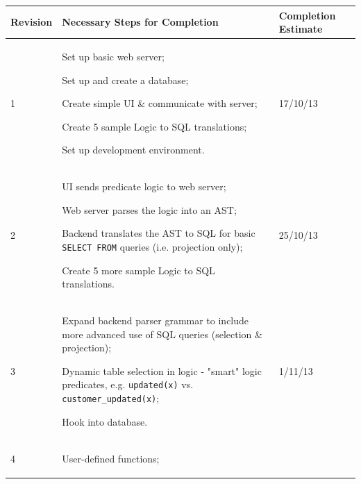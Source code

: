 \documentclass[a4paper, 11pt]{article}
\begin{document}
    \begin{table}[H]
      \centering
      \begin{tabular}{| l | p{} | l |}
        \hline
        \textbf{Revision} & \textbf{Necessary Steps for Completion}
          & \textbf{Completion Estimate} \\
        \hline
        1 &
          \begin{compactitem}
            \item Set up basic web server;
            \item Set up and create a database;
            \item Create simple UI \& communicate with server;
            \item Create 5 sample Logic to SQL translations;
            \item Set up development environment.
          \end{compactitem}
          & 17/10/13 \\
        \hline
        2 &
          \begin{compactitem}
            \item UI sends predicate logic to web server;
            \item Web server parses the logic into an AST;
            \item Backend translates the AST to SQL for basic \texttt{SELECT
              FROM} queries (i.e. projection only);
            \item Create 5 more sample Logic to SQL translations.
          \end{compactitem}
          & 25/10/13 \\
        \hline
        3 &
          \begin{compactitem}
            \item Expand backend parser grammar to include more advanced use of
              SQL queries (selection \& projection);
            \item Dynamic table selection in logic - "smart" logic predicates,
              e.g. \texttt{updated(x)} vs. \texttt{customer\_updated(x)};
            \item Hook into database.
          \end{compactitem}
          & 1/11/13 \\
        \hline
        4 &
          \begin{compactitem}
            \item User-defined functions;

\end{compactitem}
\end{tabular}
\end{table}
\end{document}
